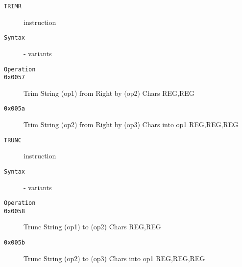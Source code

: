 \clearpage
\begin{description}
\item[\texttt{TRIMR}] instruction\\
\item[\texttt{Syntax}] - variants\\

\item[\texttt{Operation}]
\item[\texttt{}]
\item[\texttt{0x0057}] Trim String (op1) from Right by (op2) Chars  {REG,REG}           \\
\item[\texttt{0x005a}] Trim String (op2) from Right by (op3) Chars into op1  {REG,REG,REG}       \\
\end{description}
\clearpage
\begin{description}
\item[\texttt{TRUNC}] instruction\\
\item[\texttt{Syntax}] - variants\\

\item[\texttt{Operation}]
\item[\texttt{}]
\item[\texttt{0x0058}] Trunc String (op1) to (op2) Chars  {REG,REG}           \\
\item[\texttt{0x005b}] Trunc String (op2) to (op3) Chars into op1  {REG,REG,REG}       \\
\end{description}
\clearpage
